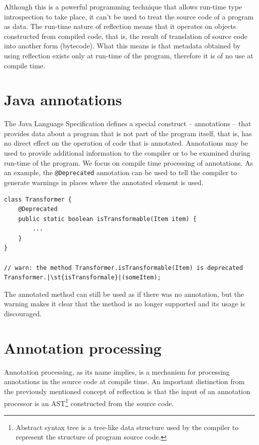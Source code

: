 Although this is a powerful programming technique that allows run-time type introspection to take place, it can’t be used to treat the source code of a program as data. The run-time nature of reflection means that it operates on objects constructed from compiled code, that is, the result of translation of source code into another form (bytecode). What this means is that metadata obtained by using reflection exists only at run-time of the program, therefore it is of no use at compile time.

\section{Java annotations}

The Java Language Specification defines a special construct – annotations – that provides data about a program that is not part of the program itself, that is, has no direct effect on the operation of code that is annotated. Annotations may be used to provide additional information to the compiler or to be examined during run-time of the program. We focus on compile time processing of annotations. As an example, the \texttt{@Deprecated} annotation can be used to tell the compiler to generate warnings in places where the annotated element is used.

\begin{verbatim}
class Transformer {
    @Deprecated
    public static boolean isTransformable(Item item) {
        ...
    }
}

// warn: the method Transformer.isTransformable(Item) is deprecated
Transformer.|\st{isTransformale}|(someItem);
\end{verbatim}

The annotated method can still be used as if there was no annotation, but the warning makes it clear that the method is no longer supported and its usage is discouraged.

\section{Annotation processing}

Annotation processing, as its name implies, is a mechanism for processing annotations in the source code at compile time. An important distinction from the previously mentioned concept of reflection is that the input of an annotation processor is an AST\footnote{Abstract syntax tree is a tree-like data structure used by the compiler to represent the structure of program source code.} constructed from the source code.

